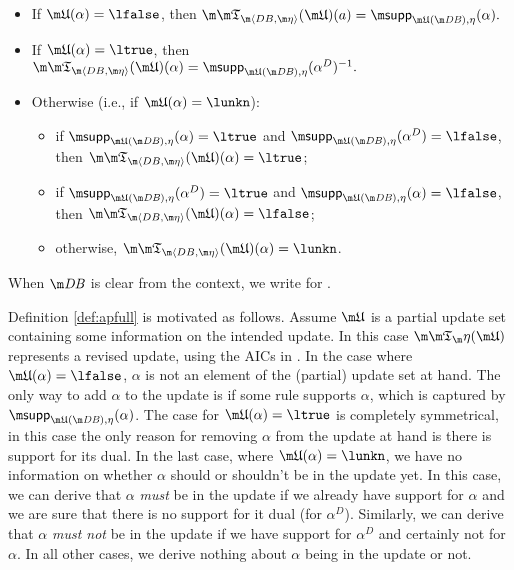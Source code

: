 \begin{definition}
\begin{itemize}
 \item If $\UUU(\alpha)=\lfalse$, then $\Apfull(\UUU)(a) = \supp_{\UUU(\db),\eta}(\alpha).$
 \item If $\UUU(\alpha)=\ltrue$, then $\Apfull(\UUU)(\alpha) = \supp_{\UUU(\db),\eta}(\alpha^D)^{-1}.$
 \item Otherwise (i.e., if $\UUU(\alpha) = \lunkn$):
  \begin{itemize}
    \item if $\supp_{\UUU(\db),\eta}(\alpha) = \ltrue$ and $\supp_{\UUU(\db),\eta}(\alpha^D)=\lfalse$, then $\Apfull(\UUU)( \alpha)=\ltrue$;
    \item if $\supp_{\UUU(\db),\eta}(\alpha^D) = \ltrue$ and $\supp_{\UUU(\db),\eta}(\alpha)=\lfalse$, then $\Apfull(\UUU)(\alpha)=\lfalse$;
    \item otherwise, $\Apfull(\UUU)(\alpha)=\lunkn$.
\end{itemize}

\end{itemize}
When $\db$ is clear from the context, we write \Ap for \Apfull.
 
\end{definition}

Definition \ref{def:apfull} is motivated as follows. Assume $\UUU$ is a partial update set containing some information on the intended update. In this case $\Ap(\UUU)$ represents a revised update, using the AICs in \aics. 
In the case where $\UUU(\alpha)=\lfalse$, $\alpha$ is not an element of the (partial) update set at hand. The only way to add $\alpha$ to the update is if some rule supports $\alpha$, which is captured by $ \supp_{\UUU(\db),\eta}(\alpha)$. 
The case for $\UUU(\alpha)=\ltrue$ is completely symmetrical, in this case the only reason for removing $\alpha$ from the update at hand is there is support for its dual.
In the last case, where $\UUU(\alpha)=\lunkn$, we have no information on whether $\alpha$ should or shouldn't be in the update yet. In this case, we can derive that $\alpha$ \emph{must} be in the update if we already have support for $\alpha$ and we are sure that there is no support for it dual (for $\alpha^D$). Similarly, we can derive that $\alpha$ \emph{must not} be in the update if we have support for $\alpha^D$ and certainly not for $\alpha$.  
In all other cases, we derive nothing about $\alpha$ being in the update or not. 

